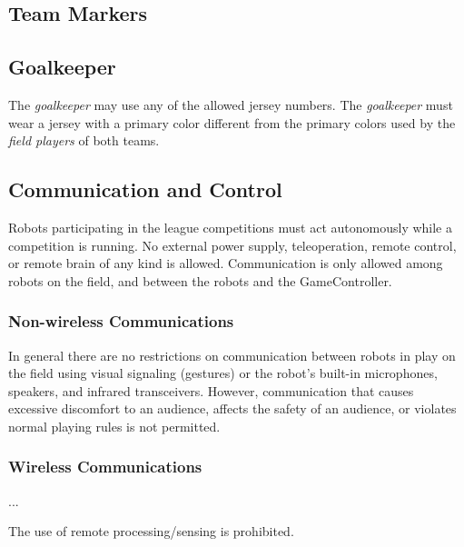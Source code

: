 \subsection{Team Markers}
\label{sec:team_markers}


\subsection{Goalkeeper}
\label{sec:goalkeeper}

The \emph{goalkeeper} may use any of the allowed jersey numbers.
The \emph{goalkeeper} must wear a jersey with a primary color different from the primary colors used by the \emph{field players} of both teams.

\subsection{Communication and Control}

Robots participating in the \leaguenameabbr league competitions must act autonomously while a competition is running. No external power supply, teleoperation, remote control, or remote brain of any kind is allowed.
Communication is only allowed among robots on the field,  and between the robots and the GameController.

\subsubsection{Non-wireless Communications}
\label{sec:acoustic}

In general there are no restrictions on communication between robots in play on the field using visual signaling (\eg gestures) or the robot's built-in microphones, speakers, and infrared transceivers.
However, communication that causes excessive discomfort to an audience, affects the safety of an audience, or violates normal playing rules is not permitted.

\subsubsection{Wireless Communications}
\label{sec:wireless}

... 

The use of remote processing/sensing is prohibited.